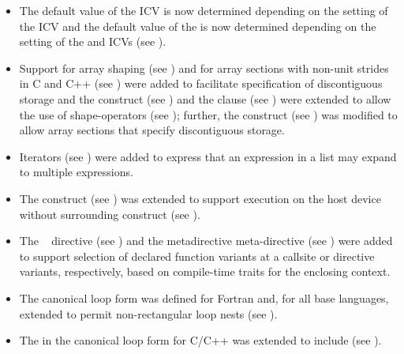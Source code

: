 \begin{itemize}
\item The default value of the  ICV is now determined depending on
the setting of the  ICV and the default value of the
 is now determined depending on the setting of the
 and  ICVs (see ).

\item Support for array shaping (see ) and 
      for array sections with non-unit strides  in C and C++ (see 
      ) were added to facilitate specification 
      of discontiguous storage and the  construct (see 
      ) and the  clause 
      (see ) were extended to allow the use 
      of shape-operators (see ); further, the 
       construct (see ) was modified to allow array sections that specify 
      discontiguous storage.

\item Iterators (see ) were added to express that an
      expression in a list may expand to multiple expressions.


\item The  construct (see ) was
      extended to support execution on the host device without surrounding
       construct (see ).

\item The ~ directive (see
      ) and the metadirective
      meta-directive (see ) were
      added to support selection of declared function variants at a callsite
      or directive variants, respectively, based on compile-time traits for
      the enclosing context.

\item The canonical loop form was defined for Fortran and, for all base
    languages, extended to permit non-rectangular loop nests (see
    ).

\item The  in the canonical loop form for C/C++ was
      extended to include \code{!=} (see ).


\end{itemize}
